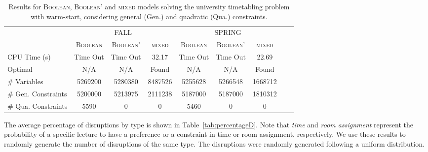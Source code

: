 \documentclass[twocolumn,natbib]{svjour3}          %
\newcounter{constraint}
\begin{document}
\begin{table*}[!h]
	\caption{Results for \textsc{Boolean}, \textsc{Boolean'} and \textsc{mixed} models solving the university timetabling problem with warm-start, considering general (Gen.) and quadratic (Qua.) constraints. }
	\label{tab:static}
	\centering
		\begin{tabular}{l|c|c|c|c|c|c|c|c|}
			\cline{2-7}
			
			& \multicolumn{3}{c|}{\textsc{\textsc{FALL}}}   & \multicolumn{3}{c|}{\textsc{\textsc{SPRING}}} \\ \cline{2-7} 
			& \textsc{Boolean} & \textsc{Boolean'}     & \textsc{mixed}  & \textsc{Boolean}    & \textsc{Boolean'}    & \textsc{mixed}  \\ \hline
			\multicolumn{1}{|l|}{CPU Time (s)} & Time Out & Time Out                  & 32.17      &    Time Out  &    Time Out            & 22.69      \\ \cline{1-7} 
			\multicolumn{1}{|l|}{Optimal}                        &   N/A &   N/A              &  Found     &    N/A &   N/A               &  Found     \\ \hline
			\multicolumn{1}{|l|}{\# Variables}                        &  5269200      &5280380  &  8487526              &  5255628     &5266548         &  1668712    \\ \hline
			\multicolumn{1}{|l|}{\# Gen. Constraints}                        &  5200000   & 5213975         & 2111238     & 5187000     & 5187000   &       1810312    \\ \hline
			\multicolumn{1}{|l|}{\# Qua. Constraints}                        &  5590     & 0          & 0     &  5460 & 0  &       0   \\ \hline
			
	\end{tabular}%

\end{table*}


The average percentage of disruptions by type is shown in Table~\ref{tab:percentageD}. Note that \textit{time} and \textit{room assignment} represent the probability of a specific lecture to have a preference or a constraint in time or room assignment, respectively. We use these results to randomly generate the number of disruptions of the same type. The disruptions were randomly generated following a uniform distribution.
\end{document}
